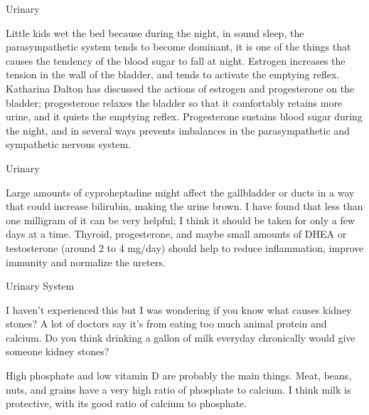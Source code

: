 \documentclass[11pt,oneside,openany,extrafontsizes]{memoir}
\begin{document}
\begin{standalonequote}{Urinary}

    \begin{answer}
        Little kids wet the bed because during the night, in sound sleep, the parasympathetic system tends to become dominant, it is one of the things that causes the tendency of the blood sugar to fall at night. Estrogen increases the tension in the wall of the bladder, and tends to activate the emptying reflex. Katharina Dalton has discussed the actions of estrogen and progesterone on the bladder; progesterone relaxes the bladder so that it comfortably retains more urine, and it quiets the emptying reflex. Progesterone sustains blood sugar during the night, and in several ways prevents imbalances in the parasympathetic and sympathetic nervous system.
    \end{answer}
\end{standalonequote}

\begin{standalonequote}{Urinary}

    \begin{answer}
        Large amounts of cyproheptadine might affect the gallbladder or ducts in a way that could increase bilirubin, making the urine brown. I have found that less than one milligram of it can be very helpful; I think it should be taken for only a few days at a time. Thyroid, progesterone, and maybe small amounts of DHEA or testosterone (around 2 to 4 mg/day) should help to reduce inflammation, improve immunity and normalize the ureters.
    \end{answer}
\end{standalonequote}

\begin{qaexchange}{Urinary System}

    \begin{question}
        I haven't experienced this but I was wondering if you know what causes kidney stones? A lot of doctors say it's from eating too much animal protein and calcium. Do you think drinking a gallon of milk everyday chronically would give someone kidney stones?
    \end{question}

    \begin{answer}
      High phosphate and low vitamin D are probably the main things. Meat, beans, nuts, and grains have a very high ratio of phosphate to calcium. I think milk is protective, with its good ratio of calcium to phosphate.
    \end{answer}
\end{qaexchange}
\end{document}
